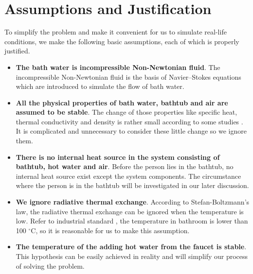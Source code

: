 
\section{Assumptions and Justification}

To simplify the problem and make it convenient for us to simulate real-life conditions, we make the following basic assumptions, each of which is properly justified.

\begin{itemize}
\item {\bf The bath water is incompressible Non-Newtonian fluid}. The incompressible Non-Newtonian fluid is the basis of Navier–Stokes equations which are introduced to simulate the flow of bath water.

\item {\bf All the physical properties of bath water, bathtub and air are assumed to be stable}. The change of those properties like specific heat, thermal conductivity and density is rather small according to some studies \cite{5}. It is complicated and unnecessary to consider these little change so we ignore them.

\item {\bf There is no internal heat source in the system consisting of bathtub, hot water and air}. Before the person lies in the bathtub, no internal heat source exist except the system components. The circumstance where the person is in the bathtub will be investigated in our later discussion.

\item {\bf We ignore radiative thermal exchange}. According to Stefan-Boltzmann’s law, the radiative thermal exchange can be ignored when the temperature is low. Refer to industrial standard \cite{6}, the temperature in bathroom is lower than 100 $^{\circ}$C, so it is reasonable for us to make this assumption.

\item {\bf The temperature of the adding hot water from the faucet is stable}. This hypothesis can be easily achieved in reality and will simplify our process of solving the problem.
\end{itemize}
